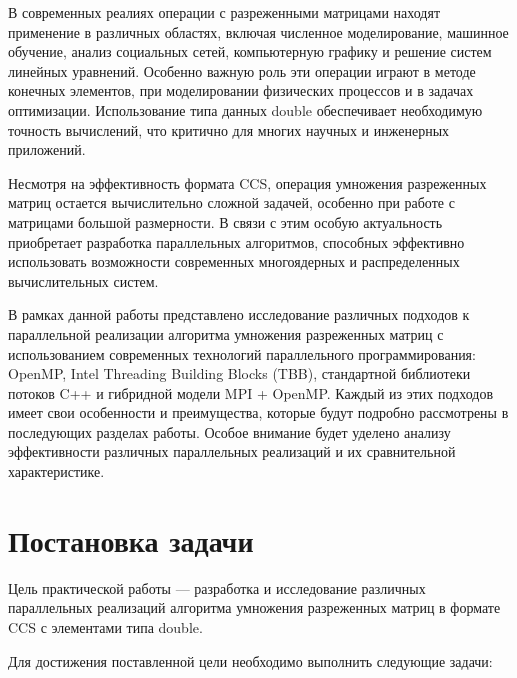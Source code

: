 \documentclass[12pt]{article}
\begin{document}
В современных реалиях операции с разреженными матрицами находят применение в различных областях, включая численное моделирование, машинное обучение, анализ социальных сетей, компьютерную графику и решение систем линейных уравнений. Особенно важную роль эти операции играют в методе конечных элементов, при моделировании физических процессов и в задачах оптимизации. Использование типа данных double обеспечивает необходимую точность вычислений, что критично для многих научных и инженерных приложений.

Несмотря на эффективность формата CCS, операция умножения разреженных матриц остается вычислительно сложной задачей, особенно при работе с матрицами большой размерности. В связи с этим особую актуальность приобретает разработка параллельных алгоритмов, способных эффективно использовать возможности современных многоядерных и распределенных вычислительных систем.

В рамках данной работы представлено исследование различных подходов к параллельной реализации алгоритма умножения разреженных матриц с использованием современных технологий параллельного программирования: OpenMP, Intel Threading Building Blocks (TBB), стандартной библиотеки потоков C++ и гибридной модели MPI + OpenMP. Каждый из этих подходов имеет свои особенности и преимущества, которые будут подробно рассмотрены в последующих разделах работы. Особое внимание будет уделено анализу эффективности различных параллельных реализаций и их сравнительной характеристике.

\section{Постановка задачи}

\hspace*{1.25em}Цель практической работы — разработка и исследование различных параллельных реализаций алгоритма умножения разреженных матриц в формате CCS с элементами типа double.

Для достижения поставленной цели необходимо выполнить следующие задачи:
\end{document}
